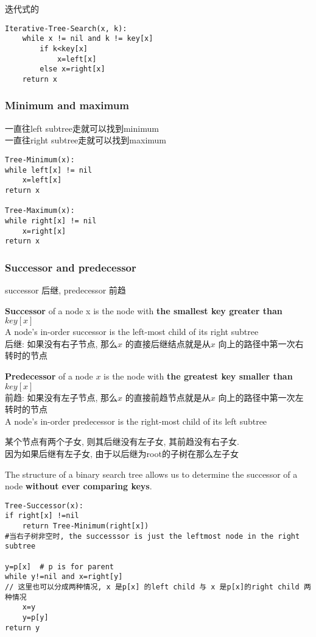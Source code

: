 \documentclass{article}
\begin{document}
迭代式的
\begin{verbatim}
Iterative-Tree-Search(x, k):
    while x != nil and k != key[x]
        if k<key[x]
            x=left[x]
        else x=right[x]
    return x
\end{verbatim}

\subsubsection{Minimum and maximum}
\noindent 一直往left subtree走就可以找到minimum\\
一直往right subtree走就可以找到maximum

\begin{verbatim}
Tree-Minimum(x):
while left[x] != nil
    x=left[x]
return x

Tree-Maximum(x):
while right[x] != nil
    x=right[x]
return x
\end{verbatim}

\subsubsection{Successor and predecessor}
successor 后继,
predecessor 前趋

\textbf{Successor} of a node x is the node with \textbf{the smallest key greater than $key[x]$}\\
A node's in-order successor is the left-most child of its right subtree\\
后继: 如果没有右子节点, 那么$x$ 的直接后继结点就是从$x$ 向上的路径中第一次右转时的节点

\textbf{Predecessor} of a node $x$ is the node with \textbf{the greatest key smaller than $key[x]$}\\
前趋: 如果没有左子节点, 那么$x$ 的直接前趋节点就是从$x$ 向上的路径中第一次左转时的节点\\
A node's in-order predecessor is the right-most child of its left subtree

某个节点有两个子女, 则其后继没有左子女, 其前趋没有右子女.\\
因为如果后继有左子女, 由于以后继为root的子树在那么左子女

The structure of a binary search tree allows us to determine the successor of a node \textbf{without ever comparing keys}.

\begin{verbatim}
Tree-Successor(x):
if right[x] !=nil
    return Tree-Minimum(right[x])
#当右子树非空时, the successsor is just the leftmost node in the right subtree

y=p[x]  # p is for parent
while y!=nil and x=right[y]
// 这里也可以分成两种情况, x 是p[x] 的left child 与 x 是p[x]的right child 两种情况
    x=y
    y=p[y]
return y
\end{verbatim}
\end{document}
